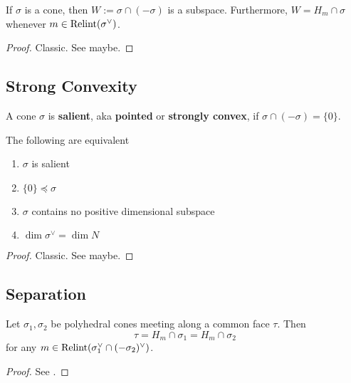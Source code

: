 \begin{lemma}
  \label{1-2-minimal-face}

  If $\sigma$ is a cone, then $W := \sigma \cap (-\sigma)$ is a subspace. Furthermore,
  $W = H_m \cap \sigma$ whenever $m \in \operatorname{Relint}(\sigma^\vee)$.
\end{lemma}
\begin{proof}
  \uses{}

  Classic. See \cite{Oda_1988} maybe.
\end{proof}


\subsection{Strong Convexity}


\begin{definition}
  \label{1-2-12-salient-cone}
  \uses{}
  \leanok

  A cone $\sigma$ is {\bf salient}, aka {\bf pointed} or {\bf strongly convex}, if $\sigma \cap (-\sigma) = \{0\}$.
\end{definition}


\begin{proposition}
  \label{1-2-12-salient-cone-tfae}

  The following are equivalent
  \begin{enumerate}
    \item $\sigma$ is salient
    \item $\{0\} \preceq \sigma$
    \item $\sigma$ contains no positive dimensional subspace
    \item $\dim \sigma^\vee = \dim N$
  \end{enumerate}
\end{proposition}
\begin{proof}
  \uses{}

  Classic. See \cite{Oda_1988} maybe.
\end{proof}


\subsection{Separation}


\begin{lemma}
  \label{1-2-13-separation-lemma}

  Let $\sigma_1, \sigma_2$ be polyhedral cones meeting along a common face $\tau$. Then
  $$\tau = H_m \cap \sigma_1 = H_m \cap \sigma_2$$
  for any $m \in \operatorname{Relint}(\sigma_1^\vee \cap (-\sigma_2)^\vee)$.
\end{lemma}
\begin{proof}

  See \cite{Cox_2011}.
\end{proof}


